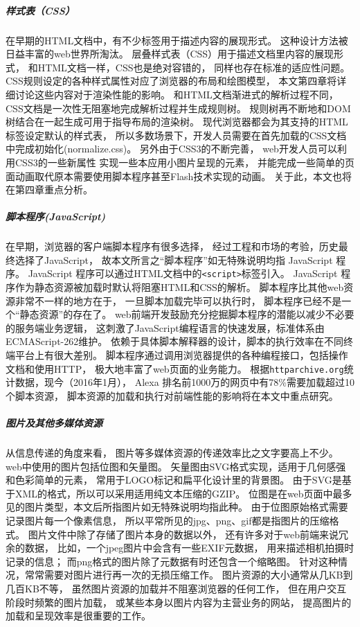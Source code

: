 	\subparagraph{样式表（CSS）}
    在早期的HTML文档中，有不少标签用于描述内容的展现形式。
    这种设计方法被日益丰富的web世界所淘汰。
    层叠样式表（CSS）用于描述文档里内容的展现形式，
    和HTML文档一样，CSS也是绝对容错的，
    同样也存在标准的适应性问题。
    CSS规则设定的各种样式属性对应了浏览器的布局和绘图模型，
    本文第四章将详细讨论这些内容对于渲染性能的影响。
    和HTML文档渐进式的解析过程不同，
    CSS文档是一次性无阻塞地完成解析过程并生成规则树。
    规则树再不断地和DOM树结合在一起生成可用于指导布局的渲染树。
    现代浏览器都会为其支持的HTML标签设定默认的样式表，
    所以多数场景下，开发人员需要在首先加载的CSS文档中完成初始化(normalize.css)。
    另外由于CSS3的不断完善，
    web开发人员可以利用CSS3的一些新属性
    实现一些本应用小图片呈现的元素，
    并能完成一些简单的页面动画取代原本需要使用脚本程序甚至Flash技术实现的动画。
    关于此，本文也将在第四章重点分析。

	\subparagraph{脚本程序(JavaScript)}
    在早期，浏览器的客户端脚本程序有很多选择，
    经过工程和市场的考验，历史最终选择了JavaScript，
    故本文所言之``脚本程序''如无特殊说明均指 JavaScript 程序。
    JavaScript 程序可以通过HTML文档中的\texttt{<script>}标签引入。
    JavaScript 程序作为静态资源被加载时默认将阻塞HTML和CSS的解析。
    脚本程序比其他web资源非常不一样的地方在于，
    一旦脚本加载完毕可以执行时，
    脚本程序已经不是一个``静态资源''的存在了。
    web前端开发鼓励充分挖掘脚本程序的潜能以减少不必要的服务端业务逻辑，
    这刺激了JavaScript编程语言的快速发展，标准体系由ECMAScript-262维护。
    依赖于具体脚本解释器的设计，脚本的执行效率在不同终端平台上有很大差别。
    脚本程序通过调用浏览器提供的各种编程接口，包括操作文档和使用HTTP，
    极大地丰富了web页面的业务能力。
    根据\texttt{httparchive.org}统计数据，现今（2016年1月），
    Alexa 排名前1000万的网页中有78\%需要加载超过10个脚本资源，
    脚本资源的加载和执行对前端性能的影响将在本文中重点研究。

    \subparagraph{图片及其他多媒体资源}
    从信息传递的角度来看，
    图片等多媒体资源的传递效率比之文字要高上不少。
    web中使用的图片包括位图和矢量图。
    矢量图由SVG格式实现，适用于几何感强和色彩简单的元素，
    常用于LOGO标记和扁平化设计里的背景图。
    由于SVG是基于XML的格式，所以可以采用适用纯文本压缩的GZIP。
    位图是在web页面中最多见的图片类型，本文后所指图片如无特殊说明均指此种。
    由于位图原始格式需要记录图片每一个像素信息，
    所以平常所见的jpg、png、gif都是指图片的压缩格式。
    图片文件中除了存储了图片本身的数据以外，
    还有许多对于web前端来说冗余的数据，
    比如，一个jpeg图片中会含有一些EXIF元数据，
    用来描述相机拍摄时记录的信息；
    而png格式的图片除了元数据有时还包含一个缩略图。
    针对这种情况，常常需要对图片进行再一次的无损压缩工作。
    图片资源的大小通常从几KB到几百KB不等，
    虽然图片资源的加载并不阻塞浏览器的任何工作，
    但在用户交互阶段时频繁的图片加载，
    或某些本身以图片内容为主营业务的网站，
    提高图片的加载和呈现效率是很重要的工作。

